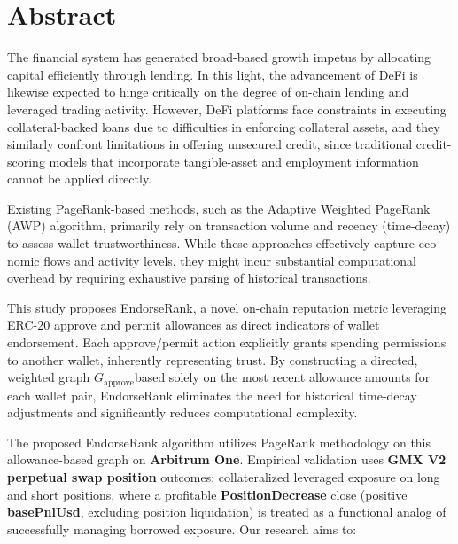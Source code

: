 \section*{Abstract}
\label{sec:abstract}

The financial system has generated broad-based growth impetus by allocating capital efficiently through lending. In this light, the advancement of DeFi is likewise expected to hinge critically on the degree of on-chain lending and leveraged trading activity. However, DeFi platforms face constraints in executing collateral-backed loans due to difficulties in enforcing collateral assets, and they similarly confront limitations in offering unsecured credit, since traditional credit-scoring models that incorporate tangible-asset and employment information cannot be applied directly.


Existing PageRank-based methods, such as the Adaptive Weighted PageRank (AWP) algorithm, primarily rely on transaction volume and recency (time-decay) to assess wallet trustworthiness. While these approaches effectively capture eco- nomic flows and activity levels, they might incur substantial computational overhead by requiring exhaustive parsing of historical transactions.


This study proposes EndorseRank, a novel on-chain reputation metric leveraging ERC-20 approve and permit allowances as direct indicators of wallet endorsement. Each approve/permit action explicitly grants spending permissions to another wallet, inherently representing trust. By constructing a directed, weighted graph $G_{\text{approve}}$based solely on the most recent allowance amounts for each wallet pair, EndorseRank eliminates the need for historical time-decay adjustments and significantly reduces computational complexity.


The proposed EndorseRank algorithm utilizes PageRank methodology on this allowance-based graph on \textbf{Arbitrum One}. Empirical validation uses \textbf{GMX V2 perpetual swap position} outcomes: collateralized leveraged exposure on long and short positions, where a profitable \textbf{PositionDecrease} close (positive \textbf{basePnlUsd}, excluding position liquidation) is treated as a functional analog of successfully managing borrowed exposure. Our research aims to:



